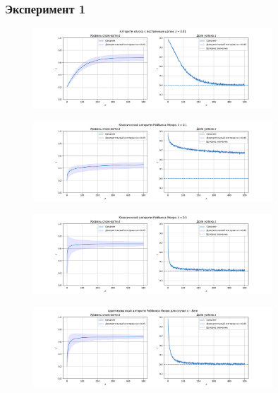 \documentclass{mipt-thesis-bs}
\begin{document}
\subsubsection{Эксперимент 1}
\begin{figure}[h!]
    \centering
    \includegraphics[width=0.8\textwidth]{assets/1/fixed.png}
    \label{exp1:fixed}
\end{figure}
\begin{figure}[h!]
    \centering
    \includegraphics[width=0.8\textwidth]{assets/1/lambda_0.1.png}
    \label{exp1:lambda_0.1}
\end{figure}
\begin{figure}[h!]
    \centering
    \includegraphics[width=0.8\textwidth]{assets/1/lambda_0.5.png}
    \label{exp1:lambda_0.5}
\end{figure}
\begin{figure}[h!]
    \centering
    \includegraphics[width=0.8\textwidth]{assets/1/adaptive.png}
    \label{exp1:adaptive}
\end{figure}
\pagebreak
\end{document}
